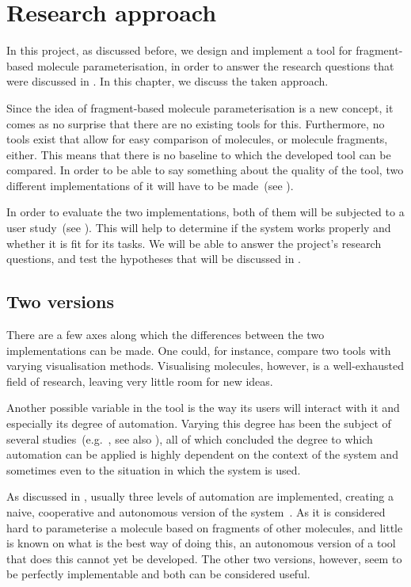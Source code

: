 \chapter{Research approach}

In this project, as discussed before, we design and implement a tool for fragment-based molecule parameterisation, in order to answer the research questions that were discussed in . In this chapter, we discuss the taken approach. 

Since the idea of fragment-based molecule parameterisation is a new concept, it comes as no surprise that there are no existing tools for this. Furthermore, no tools exist that allow for easy comparison of molecules, or molecule fragments, either. This means that there is no baseline to which the developed tool can be compared. In order to be able to say something about the quality of the tool, two different implementations of it will have to be made~(see ).

In order to evaluate the two implementations, both of them will be subjected to a user study~(see ). This will help to determine if the system works properly and whether it is fit for its tasks. We will be able to answer the project's research questions, and test the hypotheses that will be discussed in .


\section{Two versions}
There are a few axes along which the differences between the two implementations can be made. One could, for instance, compare two tools with varying visualisation methods. Visualising molecules, however, is a well-exhausted field of research, leaving very little room for new ideas.

Another possible variable in the tool is the way its users will interact with it and especially its degree of automation. Varying this degree has been the subject of several studies~(e.g.~\cite{payne2000varying, horvitz1999principles, marcus1987taking, norman1990problem}, see also ), all of which concluded the degree to which automation can be applied is highly dependent on the context of the system and sometimes even to the situation in which the system is used.

As discussed in , usually three levels of automation are implemented, creating a naive, cooperative and autonomous version of the system~\cite{payne2000varying}. As it is considered hard to parameterise a molecule based on fragments of other molecules, and little is known on what is the best way of doing this, an autonomous version of a tool that does this cannot yet be developed. The other two versions, however, seem to be perfectly implementable and both can be considered useful.

